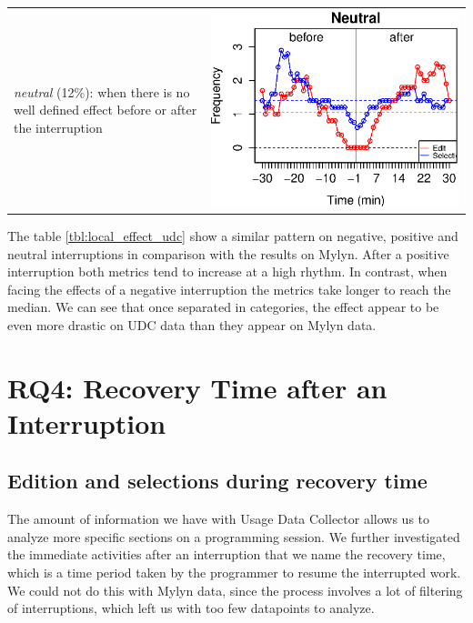 \documentclass[times]{smrauth}
\begin{document}
\begin{table}[ht!]
\begin{tabular}{p{4cm} | c}
\textit{neutral} (12\%): when there is no well defined effect before or after the interruption 
	& \includegraphics[valign=m,scale=0.3]{figures/udc_neu_ints} 
\end{tabular}
\end{table}

The table \ref{tbl:local_effect_udc} show a similar pattern on negative, positive and neutral interruptions in comparison with the results on Mylyn. After a positive interruption both metrics tend to increase at a high rhythm. In contrast, when facing the effects of a negative interruption the metrics take longer to reach the median. We can see that once separated in categories, the effect appear to be even more drastic on UDC data than they appear on Mylyn data.

\section{RQ4: Recovery Time after an Interruption}
\subsection{Edition and selections during recovery time}
The amount of information we have with Usage Data Collector allows us to analyze more specific sections on a programming session. We further investigated the immediate activities after an interruption that we name the recovery time, which is a time period taken by the programmer to resume the interrupted work. We could not do this with Mylyn data, since the process involves a lot of filtering of interruptions, which left us with too few datapoints to analyze.
\end{document}
